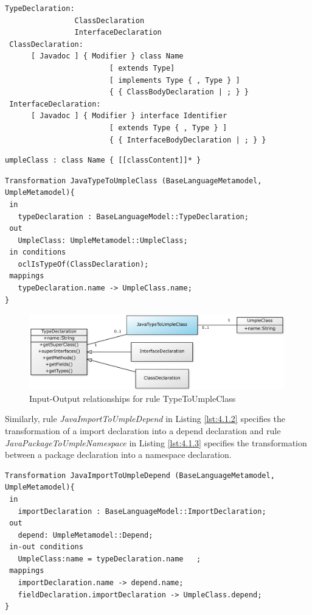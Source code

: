 \begin{lstlisting}[style=mine,caption=Grammar for Java Types,label=lst:javaGrammar1]
TypeDeclaration:
                ClassDeclaration
                InterfaceDeclaration
 ClassDeclaration:
      [ Javadoc ] { Modifier } class Name
                        [ extends Type]
                        [ implements Type { , Type } ]
                        { { ClassBodyDeclaration | ; } }
 InterfaceDeclaration:
      [ Javadoc ] { Modifier } interface Identifier
                        [ extends Type { , Type } ]
                        { { InterfaceBodyDeclaration | ; } }
\end{lstlisting}

\begin{lstlisting}[style=mine,caption=Grammar for Umple Classes,label=lst:umpleGrammar2]
 umpleClass : class Name { [[classContent]]* }
\end{lstlisting}

\begin{lstlisting}[style=mine,caption=Rule JavaTypeToUmpleClass,label=lst:4.1.1]
Transformation JavaTypeToUmpleClass (BaseLanguageMetamodel, UmpleMetamodel){ 
 in
   typeDeclaration : BaseLanguageModel::TypeDeclaration;
 out
   UmpleClass: UmpleMetamodel::UmpleClass;
 in conditions
   oclIsTypeOf(ClassDeclaration);   
 mappings
   typeDeclaration.name -> UmpleClass.name;
}
\end{lstlisting}

\begin{figure}[h]
\centering
\includegraphics[width=0.99\textwidth]{Figures/ch4InitialMapping.pdf}
\caption{Input-Output relationships for rule TypeToUmpleClass}
\label{fig:4.1.1}
\end{figure}

Similarly, rule  \textit{JavaImportToUmpleDepend} in Listing \ref{lst:4.1.2} specifies the transformation of a import declaration into a depend declaration and rule \textit{JavaPackageToUmpleNamespace} in Listing \ref{lst:4.1.3} specifies the transformation between a package declaration into a namespace declaration.

\begin{lstlisting}[style=mine,caption=Rule JavaImportToUmpleDepend,label=lst:4.1.2]
Transformation JavaImportToUmpleDepend (BaseLanguageMetamodel, UmpleMetamodel){ 
 in
   importDeclaration : BaseLanguageModel::ImportDeclaration;
 out
   depend: UmpleMetamodel::Depend;
 in-out conditions
   UmpleClass:name = typeDeclaration.name	;
 mappings
   importDeclaration.name -> depend.name;
   fieldDeclaration.importDeclaration -> UmpleClass.depend;
}
\end{lstlisting}

